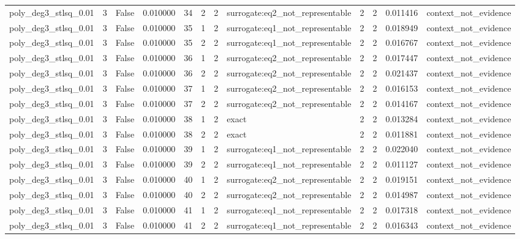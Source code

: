 \begin{tabular}{lrrrrrrlrrrl}
poly\_deg3\_stlsq\_0.01 & 3 & False & 0.010000 & 34 & 2 & 2 & surrogate:eq2\_not\_representable & 2 & 2 & 0.011416 & context\_not\_evidence \\
poly\_deg3\_stlsq\_0.01 & 3 & False & 0.010000 & 35 & 1 & 2 & surrogate:eq1\_not\_representable & 2 & 2 & 0.018949 & context\_not\_evidence \\
poly\_deg3\_stlsq\_0.01 & 3 & False & 0.010000 & 35 & 2 & 2 & surrogate:eq1\_not\_representable & 2 & 2 & 0.016767 & context\_not\_evidence \\
poly\_deg3\_stlsq\_0.01 & 3 & False & 0.010000 & 36 & 1 & 2 & surrogate:eq2\_not\_representable & 2 & 2 & 0.017447 & context\_not\_evidence \\
poly\_deg3\_stlsq\_0.01 & 3 & False & 0.010000 & 36 & 2 & 2 & surrogate:eq2\_not\_representable & 2 & 2 & 0.021437 & context\_not\_evidence \\
poly\_deg3\_stlsq\_0.01 & 3 & False & 0.010000 & 37 & 1 & 2 & surrogate:eq2\_not\_representable & 2 & 2 & 0.016153 & context\_not\_evidence \\
poly\_deg3\_stlsq\_0.01 & 3 & False & 0.010000 & 37 & 2 & 2 & surrogate:eq2\_not\_representable & 2 & 2 & 0.014167 & context\_not\_evidence \\
poly\_deg3\_stlsq\_0.01 & 3 & False & 0.010000 & 38 & 1 & 2 & exact & 2 & 2 & 0.013284 & context\_not\_evidence \\
poly\_deg3\_stlsq\_0.01 & 3 & False & 0.010000 & 38 & 2 & 2 & exact & 2 & 2 & 0.011881 & context\_not\_evidence \\
poly\_deg3\_stlsq\_0.01 & 3 & False & 0.010000 & 39 & 1 & 2 & surrogate:eq1\_not\_representable & 2 & 2 & 0.022040 & context\_not\_evidence \\
poly\_deg3\_stlsq\_0.01 & 3 & False & 0.010000 & 39 & 2 & 2 & surrogate:eq1\_not\_representable & 2 & 2 & 0.011127 & context\_not\_evidence \\
poly\_deg3\_stlsq\_0.01 & 3 & False & 0.010000 & 40 & 1 & 2 & surrogate:eq2\_not\_representable & 2 & 2 & 0.019151 & context\_not\_evidence \\
poly\_deg3\_stlsq\_0.01 & 3 & False & 0.010000 & 40 & 2 & 2 & surrogate:eq2\_not\_representable & 2 & 2 & 0.014987 & context\_not\_evidence \\
poly\_deg3\_stlsq\_0.01 & 3 & False & 0.010000 & 41 & 1 & 2 & surrogate:eq1\_not\_representable & 2 & 2 & 0.017318 & context\_not\_evidence \\
poly\_deg3\_stlsq\_0.01 & 3 & False & 0.010000 & 41 & 2 & 2 & surrogate:eq1\_not\_representable & 2 & 2 & 0.016343 & context\_not\_evidence \\

\end{tabular}
